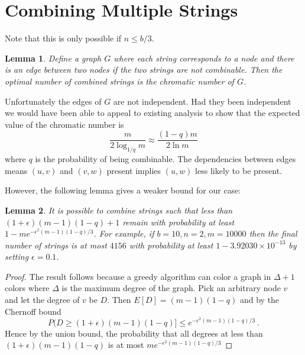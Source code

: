 \documentclass[11pt]{article}
\newtheorem{lemma}{Lemma}[section]
\begin{document}
\section{Combining Multiple Strings}
Note that this is only possible if $n\leq b/3$.
\begin{lemma}
Define a graph $G$ where each string corresponds to a node and there is an edge between two nodes if the two strings are \emph{not} combinable. Then the optimal number of combined strings is the chromatic number of $G$.
\end{lemma}

Unfortunately the edges of $G$ are not independent. Had they been independent we would have been able to appeal to existing analysis to show that the expected value of the chromatic number is 
\[
\frac{m}{2\log_{1/q} m}\approx \frac{(1-q)m}{2 \ln m}
\]
where $q$ is the probability of being combinable. 
The dependencies between edges means $(u,v)$ and $(v,w)$ present implies $(u,w)$ less likely to be present.

However, the following lemma gives a weaker bound for our case:
\begin{lemma}
It is possible to combine strings such that less than $(1+\epsilon) (m-1)(1-q)+1$ remain with probability at least $1-me^{-\epsilon^2 (m-1)(1-q)/3}$. For example, if $b=10, n=2, m=10000$ then the final number of strings is at most $4156$ with probability at least $1-3.92030 \times 10^{-13}$ by setting $\epsilon=0.1$. 
\end{lemma}
\begin{proof}
The result follows because a greedy algorithm can color a graph in $\Delta+1$ colors where $\Delta$ is the maximum degree of the graph.
Pick an arbitrary node $v$ and let the degree of $v$ be $D$. Then $E[D]=(m-1)(1-q)$ and by the Chernoff bound 
\[P(D\geq (1+\epsilon) (m-1)(1-q)] \leq e^{-\epsilon^2 (m-1)(1-q)/3}
 \ .\]
Hence by the union bound, the probability that all degrees at less than $(1+\epsilon) (m-1)(1-q)$ is at most $me^{-\epsilon^2 (m-1)(1-q)/3}$

\end{proof}
\end{document}

